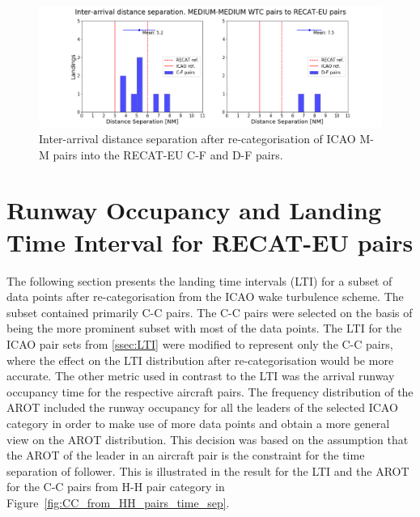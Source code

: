 \begin{figure}[h]
    \centering
    \includegraphics[width=1\textwidth]{graphics/fig_MM_to_CF_and_DF_pairs_dist_separ.png}
    \caption[Inter-arrival distance separation of ICAO M-M pairs into the RECAT-EU C-F and D-F pairs]{Inter-arrival distance separation after re-categorisation of ICAO M-M pairs into the RECAT-EU C-F and D-F pairs.}
    \label{fig:MM_to_CF_and_DF_pairs_dist_separ}
\end{figure}


\section{Runway Occupancy and Landing Time Interval for RECAT-EU pairs}
The following section presents the landing time intervals (LTI) for a subset of data points after re-categorisation from the ICAO wake turbulence scheme. The subset contained primarily C-C pairs. The C-C pairs were selected on the basis of being the more prominent subset with most of the data points. The LTI for the ICAO pair sets from \ref{ssec:LTI} were modified to represent only the C-C pairs, where the effect on the LTI distribution after re-categorisation would be more accurate. The other metric used in contrast to the LTI was the arrival runway occupancy time for the respective aircraft pairs. The frequency distribution of the AROT included the runway occupancy for all the leaders of the selected ICAO category in order to make use of more data points and obtain a more general view on the AROT distribution. This decision was based on the assumption that the AROT of the leader in an aircraft pair is the constraint for the time separation of follower. This is illustrated in the result for the LTI and the AROT for the C-C pairs from H-H pair category in Figure~\ref{fig:CC_from_HH_pairs_time_sep}. 


